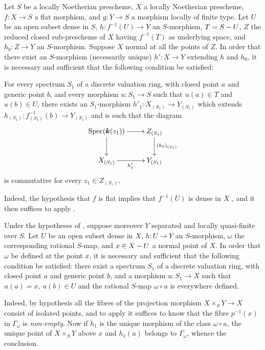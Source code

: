 \begin{corollary}[20.4.9]
\label{IV.20.4.9}
Let $S$ be a locally Noetherian prescheme, $X$ a locally Noetherian prescheme, $f:X\to S$ a flat morphism, and $g:Y\to S$ a morphism locally of finite type.
Let $U$ be an open subset dense in $S$, $h:f^{-1}(U)\to Y$ an $S$-morphism, $T=S- U$, $Z$ the reduced closed sub-prescheme of $X$ having $f^{-1}(T)$ as underlying space, and $h_0:Z\to Y$ an $S$-morphism.
Suppose $X$ \textup{normal} at all the points of $Z$.
In order that there exist an $S$-morphism (necessarily unique) $h':X\to Y$ extending $h$ and $h_0$, it is necessary and sufficient that the following condition be satisfied:

For every spectrum $S_1$ of a discrete valuation ring, with closed point $a$ and generic point $b$, and every morphism $u:S_1\to S$ such that $u(a)\in T$ and $u(b)\in U$, there exists an $S_1$-morphism $h'_1:X_{(S_1)}\to Y_{(S_1)}$ which extends $h_{(S_1)}:f_{(S_1)}^{-1}(b)\to Y_{(S_1)}$ and is such that the diagram
\[
  \xymatrix{
  \Spec(\boldsymbol{k}(z_1)) \ar[r] \ar[d] & Z_{(S_1)} \ar[d]^{(h_0)_{(S_1)}} \\
  X_{(S_1)} \ar[r]_{h'_1} & Y_{(S_1)}
  }
\]
is commutative for every $z_1\in Z_{(S_1)}$.

\end{corollary}

Indeed, the hypothesis that $f$ is flat implies that $f^{-1}(U)$ is dense in $X$ , and it then suffices to apply .

\begin{corollary}[20.4.10]
\label{IV.20.4.10}
Under the hypotheses of , suppose moreover $Y$ separated and locally quasi-finite over $S$.
Let $U$ be an open subset dense in $X$, $h:U\to Y$ an $S$-morphism, $\omega$ the corresponding rational $S$-map, and $x\in X- U$ a \textup{normal} point of $X$.
In order that $\omega$ be defined at the point $x$, it is necessary and sufficient that the following condition be satisfied: there exist a spectrum $S_1$ of a discrete valuation ring, with closed point $a$ and generic point $b$, and a morphism $u:S_1\to X$
such that $u(a)=x$, $u(b)\in U$ and the rational $S$-map $\omega\circ u$ is everywhere defined.
\end{corollary}

Indeed, by hypothesis all the fibres of the projection morphism $X\times_S Y\to X$ consist of isolated points, and to apply  it suffices to know that the fibre $p^{-1}(x)$ in $\Gamma_\omega$ is \emph{non-empty}.
Now if $h_1$ is the unique morphism of the class $\omega\circ u$, the unique point of $X\times_S Y$ above $x$ and $h_1(a)$ belongs to $\Gamma_\omega$, whence the conclusion.

